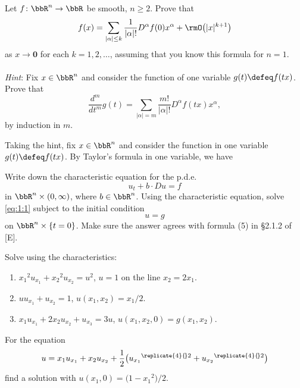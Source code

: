 \begin{problem}
  Let \(f\colon\bbR^n\to\bbR\) be smooth, \(n\geq 2\). Prove that
  \[
    f(x)=\sum_{|\alpha|\leq k}
    \frac{1}{|\alpha|!}D^\alpha f(0)x^\alpha+\rmO\bigl(|x|^{k+1}\bigr)
  \]
  as \(x\to\mathbf{0}\) for each \(k=1,2,\dotsc\), assuming that you know this
  formula for \(n=1\).
  \\\\
  \emph{Hint}: Fix \(x\in\bbR^n\) and consider the function of one variable
  \(g(t)\defeq f(tx)\). Prove that
  \[
    \frac{d^m}{d t^m}g(t)
    =\sum_{|\alpha|=m}\frac{m!}{|\alpha|!} D^\alpha f(tx)x^\alpha,
  \]
  by induction in \(m\).
\end{problem}
\begin{solution}
  Taking the hint, fix \(x\in\bbR^n\) and consider the function in one
  variable \(g(t)\defeq f(tx)\). By Taylor's formula in one variable, we
  have
\end{solution}
\newpage

\begin{problem}
  Write down the characteristic equation for the p.d.e.\@
  \[
    \label{eq:1:1}
    \tag{\(*\)}
    u_t+b\cdot Du=f
  \]
  in \(\bbR^n\times(0,\infty)\), where \(b\in\bbR^n\). Using the
  characteristic equation, solve \eqref{eq:1:1} subject to the initial
  condition
  \[
    u=g
  \]
  on \(\bbR^n\times\{t=0\}\). Make sure the answer agrees with formula (5)
  in \S 2.1.2 of [E].
\end{problem}
\begin{solution}

\end{solution}
\newpage

\begin{problem}
  Solve using the characteristics:
  \begin{enumerate}[label=(\alph*)]
  \item \({x_1}^{\!2}u_{x_1}+{x_2}^{\!2}u_{x_2}=u^2\), \(u=1\) on the line
    \(x_2=2x_1\).
  \item \(uu_{x_1}+u_{x_2}=1\), \(u(x_1,x_2)=x_1/2\).
  \item \(x_1u_{x_1}+2x_2u_{x_2}+u_{x_3}=3u\),
    \(u(x_1,x_2,0)=g(x_1,x_2)\).
  \end{enumerate}
\end{problem}
\begin{solution}

\end{solution}
\newpage

\begin{problem}
  For the equation
  \[
    u=x_1u_{x_1}+x_2u_{x_2}
    +\frac{1}{2}\bigl({u_{x_1}}^{\replicate{4}{\!}2}+{u_{x_2}}^{\replicate{4}{\!}2}\bigr)
  \]
  find a solution with \(u(x_1,0)=\bigl(1-{x_1}^{\!2}\bigr)/2\).
\end{problem}
\begin{solution}

\end{solution}

